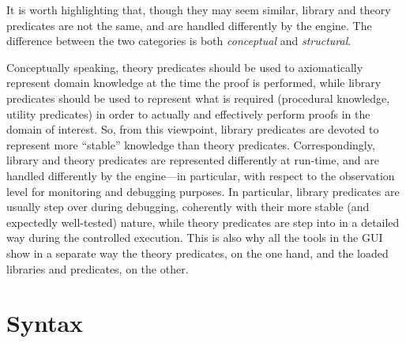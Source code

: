 It is worth highlighting that, though they may seem similar, library and theory predicates are not the same, and are handled differently by the \tuprolog{} engine.
%
The difference between the two categories is both \textit{conceptual} and \textit{structural}.

Conceptually speaking, theory predicates should be used to axiomatically represent domain knowledge at the time the proof is performed, while library predicates should be used to represent what is required (procedural knowledge, utility predicates) in order to actually and effectively perform proofs in the domain of interest. So, from this viewpoint, library predicates are devoted to represent more ``stable'' knowledge than theory predicates.
%
Correspondingly, library and theory predicates are represented differently at run-time, and are handled differently by the engine---in particular, with respect to the observation level for monitoring and debugging purposes.
%
In particular, library predicates are usually step over during debugging, coherently with their more stable (and expectedly well-tested) nature, while theory predicates are step into in a detailed way during the controlled execution.
%
This is also why all the tools in the \tuprolog{} GUI show in a separate way the theory predicates, on the one hand, and the loaded libraries and predicates, on the other.


\section{Syntax}
\label{sec:syntax}


